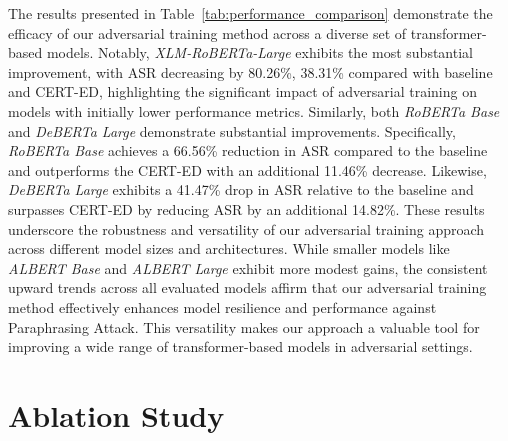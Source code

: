 The results presented in Table~\ref{tab:performance_comparison}  demonstrate the efficacy of our adversarial training method across a diverse set of transformer-based models. Notably, \textit{XLM-RoBERTa-Large} exhibits the most substantial improvement, with ASR decreasing by 80.26\%, 38.31\% compared with baseline and CERT-ED, highlighting the significant impact of adversarial training on models with initially lower performance metrics. Similarly, both \textit{RoBERTa Base} and \textit{DeBERTa Large} demonstrate substantial improvements. Specifically, \textit{RoBERTa Base} achieves a 66.56\% reduction in ASR compared to the baseline and outperforms the CERT-ED with an additional 11.46\% decrease.
Likewise, \textit{DeBERTa Large} exhibits a 41.47\% drop in ASR relative to the baseline and surpasses CERT-ED by reducing ASR by an additional 14.82\%. 
These results underscore the robustness and versatility of our adversarial training approach across different model sizes and architectures. While smaller models like \textit{ALBERT Base} and \textit{ALBERT Large} exhibit more modest gains, the consistent upward trends across all evaluated models affirm that our adversarial training method effectively enhances model resilience and performance against Paraphrasing Attack. This versatility makes our approach a valuable tool for improving a wide range of transformer-based models in adversarial settings.


\section{Ablation Study}

